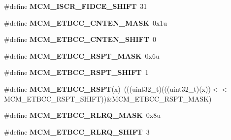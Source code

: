\begin{DoxyCompactItemize}
\item 
\#define {\bfseries M\+C\+M\+\_\+\+I\+S\+C\+R\+\_\+\+F\+I\+D\+C\+E\+\_\+\+S\+H\+I\+FT}~31\hypertarget{group__MCM__Register__Masks_ga19c565ce09db7c0d22bf65f93d9aabfc}{}\label{group__MCM__Register__Masks_ga19c565ce09db7c0d22bf65f93d9aabfc}

\item 
\#define {\bfseries M\+C\+M\+\_\+\+E\+T\+B\+C\+C\+\_\+\+C\+N\+T\+E\+N\+\_\+\+M\+A\+SK}~0x1u\hypertarget{group__MCM__Register__Masks_gaaffa6b23f821bd7647db6b0abcaf504a}{}\label{group__MCM__Register__Masks_gaaffa6b23f821bd7647db6b0abcaf504a}

\item 
\#define {\bfseries M\+C\+M\+\_\+\+E\+T\+B\+C\+C\+\_\+\+C\+N\+T\+E\+N\+\_\+\+S\+H\+I\+FT}~0\hypertarget{group__MCM__Register__Masks_ga8262666b7fec7b20ea3e871bdb325dc1}{}\label{group__MCM__Register__Masks_ga8262666b7fec7b20ea3e871bdb325dc1}

\item 
\#define {\bfseries M\+C\+M\+\_\+\+E\+T\+B\+C\+C\+\_\+\+R\+S\+P\+T\+\_\+\+M\+A\+SK}~0x6u\hypertarget{group__MCM__Register__Masks_ga155cfa2bfc46e64c665a8aeed061da6f}{}\label{group__MCM__Register__Masks_ga155cfa2bfc46e64c665a8aeed061da6f}

\item 
\#define {\bfseries M\+C\+M\+\_\+\+E\+T\+B\+C\+C\+\_\+\+R\+S\+P\+T\+\_\+\+S\+H\+I\+FT}~1\hypertarget{group__MCM__Register__Masks_ga7e85c0a405fa8e736ea6b11e2a2ce2cf}{}\label{group__MCM__Register__Masks_ga7e85c0a405fa8e736ea6b11e2a2ce2cf}

\item 
\#define {\bfseries M\+C\+M\+\_\+\+E\+T\+B\+C\+C\+\_\+\+R\+S\+PT}(x)~(((uint32\+\_\+t)(((uint32\+\_\+t)(x))$<$$<$M\+C\+M\+\_\+\+E\+T\+B\+C\+C\+\_\+\+R\+S\+P\+T\+\_\+\+S\+H\+I\+FT))\&M\+C\+M\+\_\+\+E\+T\+B\+C\+C\+\_\+\+R\+S\+P\+T\+\_\+\+M\+A\+SK)\hypertarget{group__MCM__Register__Masks_ga7855e4b02297a6ed3202b7ee2bb536f5}{}\label{group__MCM__Register__Masks_ga7855e4b02297a6ed3202b7ee2bb536f5}

\item 
\#define {\bfseries M\+C\+M\+\_\+\+E\+T\+B\+C\+C\+\_\+\+R\+L\+R\+Q\+\_\+\+M\+A\+SK}~0x8u\hypertarget{group__MCM__Register__Masks_ga16853921aa4b5ded12e5bf4d2c8509fb}{}\label{group__MCM__Register__Masks_ga16853921aa4b5ded12e5bf4d2c8509fb}

\item 
\#define {\bfseries M\+C\+M\+\_\+\+E\+T\+B\+C\+C\+\_\+\+R\+L\+R\+Q\+\_\+\+S\+H\+I\+FT}~3\hypertarget{group__MCM__Register__Masks_ga9ea97398989700f275f186a44b5d86b7}{}\label{group__MCM__Register__Masks_ga9ea97398989700f275f186a44b5d86b7}


\end{DoxyCompactItemize}
